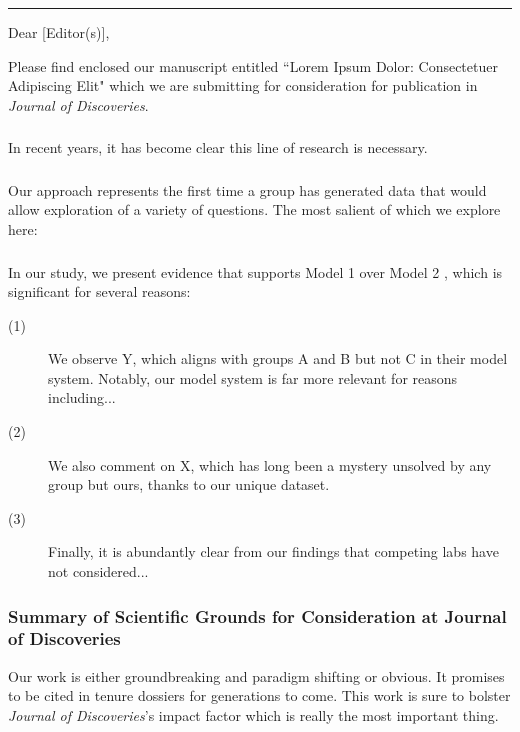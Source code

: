 \documentclass[11pt]{article}
\newcommand{\journalname}{Journal of Discoveries} %
\begin{document}
\noindent\rule{\linewidth}{1.2pt} %
\bigskip
\noindent Dear [Editor(s)],

\noindent Please find enclosed our manuscript entitled ``Lorem Ipsum Dolor: Consectetuer Adipiscing Elit" which we are submitting for consideration for publication in \textit{\journalname}. %

\subsubsection{}
\noindent In recent years, it has become clear this line of research is necessary. \lipsum[1] %

\subsubsection{}
\noindent Our approach represents the first time a group has generated data that would allow exploration of a variety of questions. The most salient of which we explore here: 

\subsubsection{}
In our study, we present evidence that supports Model 1 \citep{zany2023quantum} over Model 2 \citep{wacky2023spaghetti}, which is significant for several reasons:

\begin{description}
  \item[(1)] We observe Y, which aligns with groups A and B but not C in their model system. Notably, our model system is far more relevant for reasons including...
  \item[(2)] We also comment on X, which has long been a mystery unsolved by any group but ours, thanks to our unique dataset.
  \item[(3)] Finally, it is abundantly clear from our findings that competing labs have not considered...
\end{description}

\subsubsection*{Summary of Scientific Grounds for Consideration at \journalname}
\noindent Our work is either groundbreaking and paradigm shifting or obvious. It promises to be cited in tenure dossiers for generations to come. This work is sure to bolster \textit{\journalname}'s impact factor which is really the most important thing. 
\end{document}
